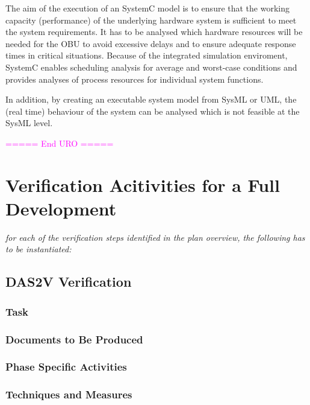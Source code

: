 \documentclass{template/openetcs_report}
\begin{document}
The aim of the execution of an SystemC model is to ensure that the working capacity (performance) of the underlying hardware system is sufficient to meet the system requirements. It has to be analysed which hardware resources will be needed for the OBU to avoid excessive delays and to ensure adequate response times in critical situations.  Because of the integrated simulation enviroment, SystemC enables scheduling analysis for average and worst-case conditions and provides analyses of process resources for individual system functions.

In addition, by creating an executable system model from SysML or UML, the (real time) behaviour of the system can be analysed which is not feasible at the SysML level.

\textcolor{magenta}{===== End URO =====}

\section{Verification Acitivities for a Full Development}
\label{sec:verif-full-devel}

\textit{for each of the verification steps identified in the plan
  overview, the following has to be instantiated: }
\subsection{DAS2V Verification}
\label{sec:dasv-verification}

\subsubsection{Task}
\label{sec:dasv-verif-task}

\subsubsection{Documents to Be Produced}
\label{sec:dasv-verif-docum-be-prod}

\subsubsection{Phase Specific Activities}
\label{sec:dasv-verif-phase-spec-activ}

\subsubsection{Techniques and Measures}
\label{sec:dasv-verif-techniques-measures}
\end{document}
